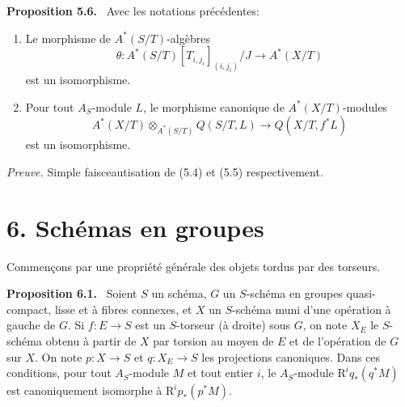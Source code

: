 \documentclass[11pt]{article}
\newenvironment{statement}[1]{\par\medskip\noindent\textbf{#1.}\ }{\par\medskip}
\newcommand{\R}{\mathrm{R}}\newcommand{\RHomCore}{\mathrm{RHom}}
\providecommand{\R}{\mathrm R}
\begin{document}
\begin{statement}{Proposition 5.6}
Avec les notations précédentes:
\begin{enumerate}[label=\alph*)]
\item Le morphisme de $A^*(S/T)$-algèbres
\[
\theta:A^*(S/T)[T_{i,j_i}]_{(i,j_i)}/J\to A^*(X/T)
\]
est un isomorphisme.
\item Pour tout $A_S$-module $L$, le morphisme canonique de $A^*(X/T)$-modules
\[
A^*(X/T)\otimes_{A^*(S/T)}Q(S/T,L)\to Q(X/T,f^*L)
\]
est un isomorphisme.
\end{enumerate}
\end{statement}

\emph{Preuve.} Simple faisceautisation de (5.4) et (5.5) respectivement.

\section*{6. Schémas en groupes}

Commençons par une propriété générale des objets tordus par des torseurs.

\begin{statement}{Proposition 6.1}
Soient $S$ un schéma, $G$ un $S$-schéma en groupes quasi-compact, lisse et à fibres connexes, et $X$ un $S$-schéma muni d'une opération à gauche de $G$. Si $f:E\to S$ est un $S$-torseur (à droite) sous $G$, on note $X_E$ le $S$-schéma obtenu à partir de $X$ par torsion au moyen de $E$ et de l'opération de $G$ sur $X$. On note $p:X\to S$ et $q:X_E\to S$ les projections canoniques. Dans ces conditions, pour tout $A_S$-module $M$ et tout entier $i$, le $A_S$-module $\R^iq_*(q^*M)$ est canoniquement isomorphe à $\R^ip_*(p^*M)$.
\end{statement}
\end{document}
